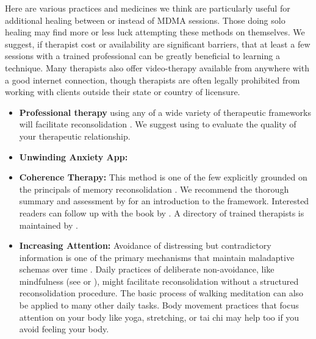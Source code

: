 \documentclass[12pt,letterpaper]{book}
\begin{document}
Here are various practices and medicines we think are particularly useful for additional healing between or instead of MDMA sessions. Those doing solo healing may find more or less luck attempting these methods on themselves. We suggest, if therapist cost or availability are significant barriers, that at least a few sessions with a trained professional can be greatly beneficial to learning a technique. Many therapists also offer video-therapy available from anywhere with a good internet connection, though therapists are often legally prohibited from working with clients outside their state or country of licensure.
\begin{itemize}
    \item \textbf{Professional therapy} using any of a wide variety of therapeutic frameworks will facilitate reconsolidation \cite{eckerUnlocking}. We suggest using \textcite{BRWAIdownload} to evaluate the quality of your therapeutic relationship.
	\item \textbf{Unwinding Anxiety App:} 
 	\item \textbf{Coherence Therapy:} This method is one of the few explicitly grounded on the principals of memory reconsolidation \cite{eckerUnlocking}. We recommend the thorough summary and assessment by \textcite{lesswrongCoherenceTherapy} for an introduction to the framework. Interested readers can follow up with the book by \textcite{eckerUnlocking}. A directory of trained therapists is maintained by \textcite{coherenceDirectory}.
 	\item \textbf{Increasing Attention:} Avoidance of distressing but contradictory information is one of the primary mechanisms that maintain maladaptive schemas over time \cite{berghSelfEvidencing}. Daily practices of deliberate non-avoidance, like mindfulness (see \textcite{rain} or \textcite{walkingMeditation}), might facilitate reconsolidation without a structured reconsolidation procedure. The basic process of walking meditation can also be applied to many other daily tasks. Body movement practices that focus attention on your body like yoga, stretching, or tai chi may help too if you avoid feeling your body.
 	

\end{itemize}
\end{document}
